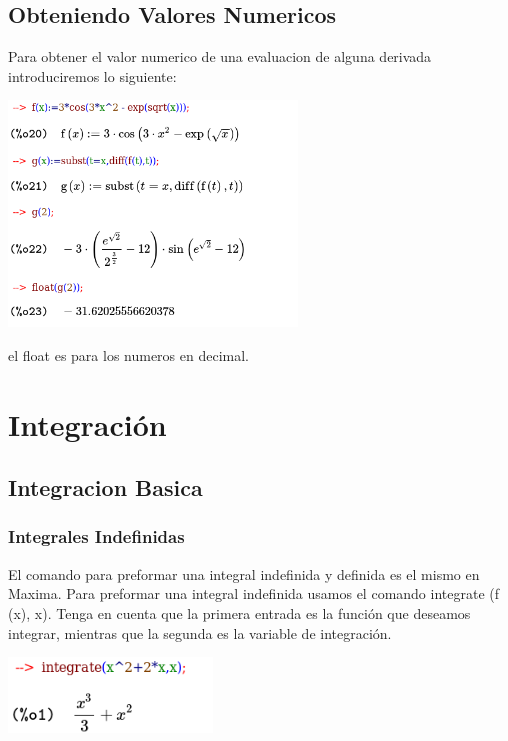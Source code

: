\documentclass{article}
\begin{document}
\subsection{Obteniendo Valores Numericos}

Para obtener el valor numerico de una evaluacion de alguna derivada introduciremos lo siguiente:


\begin{center}
\includegraphics[height=6cm]{fto25.png}
\end{center}

el float es para los numeros en decimal.


\section{Integración}

\subsection{Integracion Basica}

\subsubsection{Integrales Indefinidas}

El comando para preformar una integral indefinida y definida es el mismo en Maxima. Para preformar una integral indefinida usamos el comando integrate (f (x), x). Tenga en cuenta que la primera entrada es la función que deseamos integrar, mientras que la segunda es la variable de integración.


\begin{center}
\includegraphics[height=2cm]{fto26.png}
\end{center}
\end{document}
